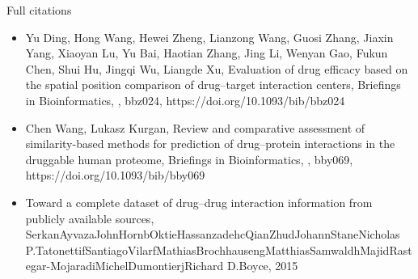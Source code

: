 \documentclass[10pt]{beamer}
\begin{document}
\begin{frame}{Full citations}
	\footnotesize
	\begin{itemize}
		\item Yu Ding, Hong Wang, Hewei Zheng, Lianzong Wang, Guosi Zhang, Jiaxin Yang, Xiaoyan Lu, Yu Bai, Haotian Zhang, Jing Li, Wenyan Gao, Fukun Chen, Shui Hu, Jingqi Wu, Liangde Xu, Evaluation of drug efficacy based on the spatial position comparison of drug–target interaction centers, Briefings in Bioinformatics, , bbz024, https://doi.org/10.1093/bib/bbz024
		\item Chen Wang, Lukasz Kurgan, Review and comparative assessment of similarity-based methods for prediction of drug–protein interactions in the druggable human proteome, Briefings in Bioinformatics, , bby069, https://doi.org/10.1093/bib/bby069
		\item Toward a complete dataset of drug–drug interaction information from publicly available sources, SerkanAyvazaJohnHornbOktieHassanzadehcQianZhudJohannStaneNicholas P.TatonettifSantiagoVilarfMathiasBrochhausengMatthiasSamwaldhMajidRastegar-MojaradiMichelDumontierjRichard D.Boyce, 2015
		
	\end{itemize}
\end{frame}
\end{document}
